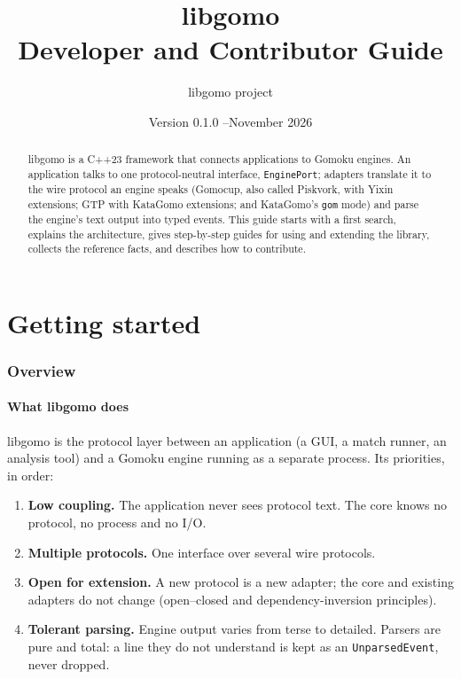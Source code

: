 \documentclass[11pt,a4paper]{article}
\title{\textbf{libgomo}\\[4pt]\large Developer and Contributor Guide}
\author{libgomo project}
\date{Version 0.1.0 \quad--\quad November 2026}
\newcommand{\code}[1]{\texttt{#1}}
\begin{document}
\maketitle

\begin{abstract}
\noindent libgomo is a C++23 framework that connects applications to Gomoku engines. An application
talks to one protocol-neutral interface, \code{EnginePort}; adapters translate it to the wire
protocol an engine speaks (Gomocup, also called Piskvork, with Yixin extensions; GTP with KataGomo
extensions; and KataGomo's \code{gom} mode) and parse the engine's text output into typed events.
This guide starts with a first search, explains the architecture, gives step-by-step guides for
using and extending the library, collects the reference facts, and describes how to contribute.
\end{abstract}

\tableofcontents
\newpage


\part{Getting started}

\section{Overview}

\subsection{What libgomo does}

libgomo is the protocol layer between an application (a GUI, a match runner, an analysis tool) and
a Gomoku engine running as a separate process. Its priorities, in order:

\begin{enumerate}
  \item \textbf{Low coupling.} The application never sees protocol text. The core knows no
        protocol, no process and no I/O.
  \item \textbf{Multiple protocols.} One interface over several wire protocols.
  \item \textbf{Open for extension.} A new protocol is a new adapter; the core and existing
        adapters do not change (open--closed and dependency-inversion principles).
  \item \textbf{Tolerant parsing.} Engine output varies from terse to detailed. Parsers are pure
        and total: a line they do not understand is kept as an \code{UnparsedEvent}, never dropped.
\end{enumerate}
\end{document}
